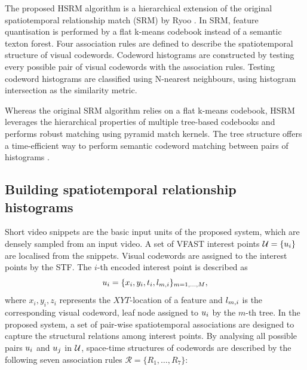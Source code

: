 The proposed HSRM algorithm is a hierarchical extension of the original spatiotemporal relationship match (SRM) by Ryoo \etal \cite{Ryoo2009}. In SRM, feature quantisation is performed by a flat k-means codebook instead of a semantic texton forest. Four association rules are defined to describe the spatiotemporal structure of visual codewords. Codeword histograms are constructed by testing every possible pair of visual codewords with the association rules. Testing codeword histograms are classified using N-nearest neighbours, using histogram intersection as the similarity metric.

Whereas the original SRM algorithm relies on a flat k-means codebook, HSRM leverages the hierarchical properties of multiple tree-based codebooks and performs robust matching using pyramid match kernels. The tree structure offers a time-efficient way to perform semantic codeword matching between pairs of histograms \cite{Grauman2005}.

\subsection{Building spatiotemporal relationship histograms}
\label{sec/act/hsrmhistogram}

Short video snippets are the basic input units of the proposed system, which are densely sampled from an input video.  
A set of VFAST interest points $\mathcal{U} = \{u_{i}\}$ are localised from the snippets. Visual codewords are assigned to the interest points by the STF.   
The $i$-th encoded interest point is described as 
\begin{equation}
	u_{i} = \{x_i, y_i, t_i, l_{m,i}\}_{m=1,\dots,M},
\end{equation}
where $x_i, y_i, z_i$ represents the $XYT$-location of a feature and $l_{m,i}$ is the corresponding visual codeword, \ie leaf node assigned to $u_{i}$ by the $m$-th tree. 
In the proposed system, a set of pair-wise spatiotemporal associations are designed to capture the structural relations among interest points. By analysing all possible pairs $u_i$ and $u_j$ in $\mathcal{U}$, space-time structures of codewords are described by the following seven association rules $\mathcal{R} = \{ R_1,\dots,R_7\}$:

